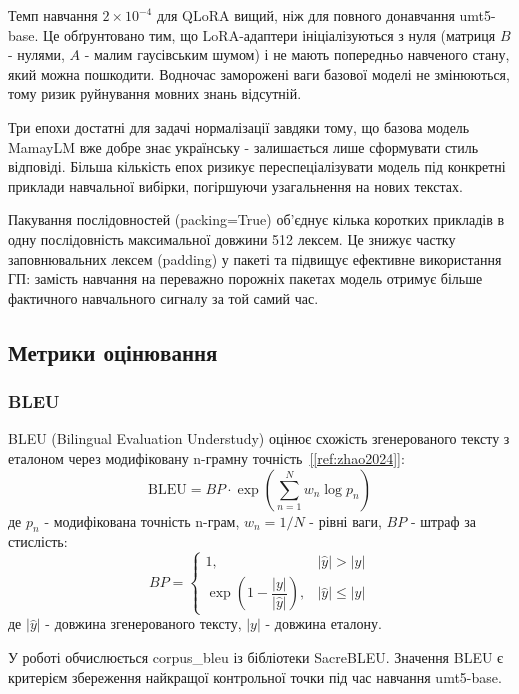 \documentclass[14pt]{extarticle}
\newcommand{\citeref}[1]{\hyperref[#1]{[\ref*{#1}]}}
\begin{document}
Темп навчання $2 \times 10^{-4}$ для QLoRA вищий, ніж для повного донавчання umt5-base. Це обґрунтовано тим, що LoRA-адаптери ініціалізуються з нуля (матриця $B$ - нулями, $A$ - малим гаусівським шумом) і не мають попередньо навченого стану, який можна пошкодити. Водночас заморожені ваги базової моделі не змінюються, тому ризик руйнування мовних знань відсутній.

Три епохи достатні для задачі нормалізації завдяки тому, що базова модель MamayLM вже добре знає українську - залишається лише сформувати стиль відповіді. Більша кількість епох ризикує переспеціалізувати модель під конкретні приклади навчальної вибірки, погіршуючи узагальнення на нових текстах.

Пакування послідовностей (packing=True) об'єднує кілька коротких прикладів в одну послідовність максимальної довжини 512 лексем. Це знижує частку заповнювальних лексем (padding) у пакеті та підвищує ефективне використання ГП: замість навчання на переважно порожніх пакетах модель отримує більше фактичного навчального сигналу за той самий час.

\subsection{Метрики оцінювання}

\subsubsection{BLEU}

BLEU (Bilingual Evaluation Understudy) оцінює схожість згенерованого тексту з еталоном через модифіковану n-грамну точність~\citeref{ref:zhao2024}:
\begin{equation}
  \text{BLEU} = BP \cdot \exp\!\left(\sum_{n=1}^{N} w_n \log p_n\right)
  \label{eq:bleu}
\end{equation}
де $p_n$ - модифікована точність n-грам, $w_n = 1/N$ - рівні ваги, $BP$ - штраф за стислість:
\begin{equation}
  BP = \begin{cases}
    1, & |\hat{y}| > |y| \\[4pt]
    \exp\!\left(1 - \dfrac{|y|}{|\hat{y}|}\right), & |\hat{y}| \leq |y|
  \end{cases}
  \label{eq:bp}
\end{equation}
де $|\hat{y}|$ - довжина згенерованого тексту, $|y|$ - довжина еталону.

У роботі обчислюється corpus\_bleu із бібліотеки SacreBLEU. Значення BLEU є критерієм збереження найкращої контрольної точки під час навчання umt5-base.
\end{document}
